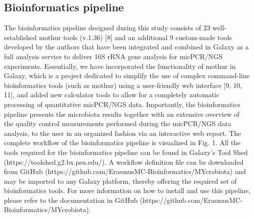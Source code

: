 \subsection*{Bioinformatics pipeline}
The bioinformatics pipeline designed during this study consists of 23 well-established mothur tools (v.1.36) [8] and an additional 9 custom-made tools developed by the authors that have been integrated and combined in Galaxy as a full analysis service to deliver 16S rRNA gene analysis for micPCR/NGS experiments. Essentially, we have incorporated the functionality of mothur in Galaxy, which is a project dedicated to simplify the use of complex command-line bioinformatics tools (such as mothur) using a user-friendly web interface [9, 10, 11], and added new calculator tools to allow for a completely automatic processing of quantitative micPCR/NGS data. Importantly, the bioinformatics pipeline presents the microbiota results together with an extensive overview of the quality control measurements performed during the micPCR/NGS data analysis, to the user in an organized fashion via an interactive web report. The complete workflow of the bioinformatics pipeline is visualized in Fig. 1. All the tools required for the bioinformatics pipeline can be found in Galaxy’s Tool Shed (https://toolshed.g2.bx.psu.edu/). A workflow definition file can be downloaded from GitHub (https://github.com/ErasmusMC-Bioinformatics/MYcrobiota) and may be imported to any Galaxy platform, thereby offering the required set of bioinformatics tools. For more information on how to install and use this pipeline, please refer to the documentation in GitHub (https://github.com/ErasmusMC-Bioinformatics/MYcrobiota).

